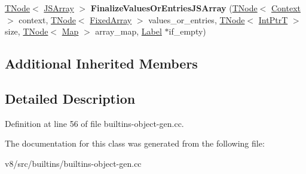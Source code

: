 \begin{DoxyCompactItemize}
\item 
\mbox{\label{classv8_1_1internal_1_1ObjectEntriesValuesBuiltinsAssembler_a4b7b9534dfaf690774d9f23adbefb2c8}} 
\mbox{\hyperlink{classv8_1_1internal_1_1compiler_1_1TNode}{T\+Node}}$<$ \mbox{\hyperlink{classv8_1_1internal_1_1JSArray}{J\+S\+Array}} $>$ {\bfseries Finalize\+Values\+Or\+Entries\+J\+S\+Array} (\mbox{\hyperlink{classv8_1_1internal_1_1compiler_1_1TNode}{T\+Node}}$<$ \mbox{\hyperlink{classv8_1_1internal_1_1Context}{Context}} $>$ context, \mbox{\hyperlink{classv8_1_1internal_1_1compiler_1_1TNode}{T\+Node}}$<$ \mbox{\hyperlink{classv8_1_1internal_1_1FixedArray}{Fixed\+Array}} $>$ values\+\_\+or\+\_\+entries, \mbox{\hyperlink{classv8_1_1internal_1_1compiler_1_1TNode}{T\+Node}}$<$ \mbox{\hyperlink{structv8_1_1internal_1_1IntPtrT}{Int\+PtrT}} $>$ size, \mbox{\hyperlink{classv8_1_1internal_1_1compiler_1_1TNode}{T\+Node}}$<$ \mbox{\hyperlink{classv8_1_1internal_1_1Map}{Map}} $>$ array\+\_\+map, \mbox{\hyperlink{classv8_1_1internal_1_1compiler_1_1CodeAssemblerLabel}{Label}} $\ast$if\+\_\+empty)
\end{DoxyCompactItemize}
\subsection*{Additional Inherited Members}


\subsection{Detailed Description}


Definition at line 56 of file builtins-\/object-\/gen.\+cc.



The documentation for this class was generated from the following file\+:\begin{DoxyCompactItemize}
\item 
v8/src/builtins/builtins-\/object-\/gen.\+cc\end{DoxyCompactItemize}
